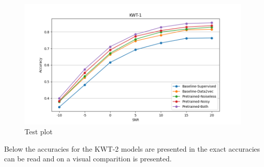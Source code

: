 \begin{figure}[H]
    \centering
    \includegraphics[width=\textwidth]{incl/img/results/kwt1_busxbblxcafxsnn.png}
    \caption{Test plot}
    \label{fig:KWT-1_snrmix_busxbblxcafxssn}
\end{figure}

Below the accuracies for the KWT-2 models are presented in  the exact accuracies can be read and on  a visual comparition is presented.

